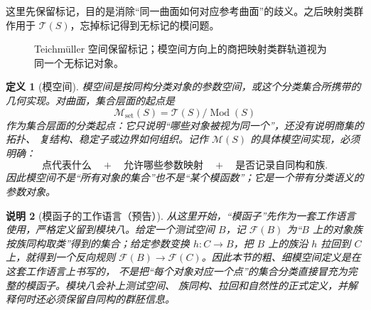 \documentclass[UTF8,fontset=none,a4paper,11pt]{ctexart}
\theoremstyle{foundation-definition}
\newtheorem{definition}{定义}[section]
\theoremstyle{foundation-theorem}
\theoremstyle{foundation-proposition}
\theoremstyle{foundation-example}
\theoremstyle{foundation-remark}
\newtheorem{remark}[definition]{说明}
\theoremstyle{foundation-theorem}
\newcommand{\T}{\mathcal T}
\newcommand{\M}{\mathcal M}
\newcommand{\Mod}{\operatorname{Mod}}
\begin{document}
这里先保留标记，目的是消除“同一曲面如何对应参考曲面”的歧义。之后映射类群作用于 \(\T(S)\)，忘掉标记得到无标记的模问题。

\begin{figure}[htbp]
\centering
{}
\caption{Teichmüller 空间保留标记；模空间方向上的商把映射类群轨道视为同一个无标记对象。}
\label{fig:teich-moduli-quotient}
\end{figure}

\begin{definition}[模空间]\label{def:moduli}
模空间是按同构分类对象的参数空间，或这个分类集合所携带的几何实现。对曲面，集合层面的起点是
\[
\M_{\mathrm{set}}(S)=\T(S)/\Mod(S)
\]
作为集合层面的分类起点：它只说明“哪些对象被视为同一个”，还没有说明商集的拓扑、
复结构、稳定子或边界如何组织。记作 \(\M(S)\) 的具体模空间实现，必须明确：
\[
\text{点代表什么}\quad+\quad\text{允许哪些参数映射}\quad+\quad
\text{是否记录自同构和族}.
\]
因此模空间不是“所有对象的集合”也不是“某个模函数”；它是一个带有分类语义的参数对象。
\end{definition}

\begin{remark}[模函子的工作语言（预告）]\label{rem:moduli-functor-preview}
从这里开始，“模函子”先作为一套工作语言使用，严格定义留到模块八。给定一个测试空间
\(B\)，记 \(\mathcal F(B)\) 为“\(B\) 上的对象族按族同构取类”得到的集合；给定参数变换
\(h:C\to B\)，把 \(B\) 上的族沿 \(h\) 拉回到 \(C\) 上，就得到一个反向规则
\(\mathcal F(B)\to\mathcal F(C)\)。因此本节的粗、细模空间定义是在这套工作语言上书写的，
不是把“每个对象对应一个点”的集合分类直接冒充为完整的模函子。模块八会补上测试空间、
族同构、拉回和自然性的正式定义，并解释何时还必须保留自同构的群胚信息。
\end{remark}
\end{document}
